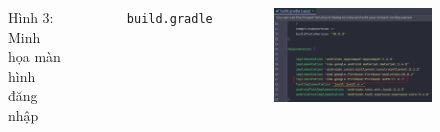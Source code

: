 \documentclass{beamer}
\begin{document}
\begin{frame}
\begin{columns}
\begin{figure}
            \caption{\centering\tiny{Hình 3: Minh họa màn hình đăng nhập}}
        \end{figure}
        \indent \texttt{build.gradle}
        \begin{figure}
            \centering
            \includegraphics[width=\textwidth]{images/27.png}
        \end{figure}
    \end{columns}
\end{frame}
\end{document}
